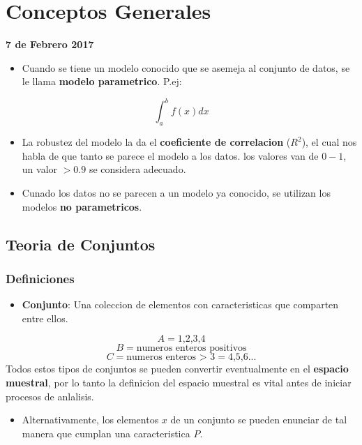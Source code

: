 \documentclass[]{book}
\providecommand{\tightlist}{%
  \setlength{\itemsep}{0pt}\setlength{\parskip}{0pt}}
\begin{document}
\chapter{Conceptos Generales}\label{conceptos-generales-2}

\textbf{7 de Febrero 2017}

\begin{itemize}
\tightlist
\item
  Cuando se tiene un modelo conocido que se asemeja al conjunto de
  datos, se le llama \textbf{modelo parametrico}. P.ej:
\end{itemize}

\[\int_{a}^{b} f(x)dx\]

\begin{itemize}
\tightlist
\item
  La robustez del modelo la da el \textbf{coeficiente de correlacion}
  (\(R^2\)), el cual nos habla de que tanto se parece el modelo a los
  datos. los valores van de \(0-1\), un valor \(>0.9\) se considera
  adecuado.
\item
  Cunado los datos no se parecen a un modelo ya conocido, se utilizan
  los modelos \textbf{no parametricos}.
\end{itemize}

\section{Teoria de Conjuntos}\label{teoria-de-conjuntos-2}

\subsection{Definiciones}\label{definiciones-2}

\begin{itemize}
\tightlist
\item
  \textbf{Conjunto}: Una coleccion de elementos con caracteristicas que
  comparten entre ellos.
\end{itemize}

\[A=\text{{1,2,3,4}}\] \[B = \text{{numeros enteros positivos}}\]
\[ C = \text{{numeros enteros > 3}} = \text{{4,5,6...}}\] Todos estos
tipos de conjuntos se pueden convertir eventualmente en el
\textbf{espacio muestral}, por lo tanto la definicion del espacio
muestral es vital antes de iniciar procesos de anlalisis.

\begin{itemize}
\tightlist
\item
  Alternativamente, los elementos \(x\) de un conjunto se pueden
  enunciar de tal manera que cumplan una caracteristica \(P\).
\end{itemize}
\end{document}
